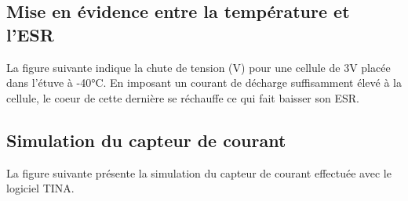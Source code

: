 




\subsection{Mise en évidence entre la température et l'ESR}

La figure suivante indique la chute de tension (V) pour une cellule de 3V placée dans l'étuve à -40°C. 
En imposant un courant de décharge suffisamment élevé à la cellule, le coeur de cette dernière se réchauffe ce qui fait baisser son ESR.









\subsection{Simulation du capteur de courant}

La figure suivante présente la simulation du capteur de courant effectuée avec le logiciel TINA.


\newpage
{}
